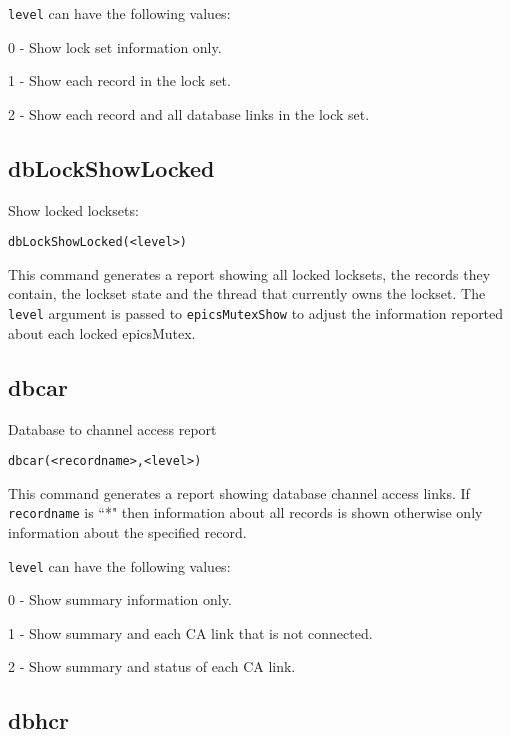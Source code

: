 \verb|level| can have the following values:

\begin{description}\item 0 - Show lock set information only.

\item 1 - Show each record in the lock set.

\item 2 - Show each record and all database links in the lock set.

\end{description}\subsection{dbLockShowLocked}

Show locked locksets:

\begin{verbatim}dbLockShowLocked(<level>)
\end{verbatim}This command generates a report showing all locked locksets, the records they contain, the lockset state and the thread 
that currently owns the lockset. The \verb|level| argument is passed to \verb|epicsMutexShow| to adjust the information reported 
about each locked epicsMutex.

\subsection{dbcar}

Database to channel access report

\begin{verbatim}dbcar(<recordname>,<level>)
\end{verbatim}This command generates a report showing database channel access links. If \verb|recordname| is ``*" then information about 
all records is shown otherwise only information about the specified record.

\verb|level| can have the following values:

\begin{description}\item 0 - Show summary information only.

\item 1 - Show summary and each CA link that is not connected.

\item 2 - Show summary and status of each CA link.

\end{description}\subsection{dbhcr}

